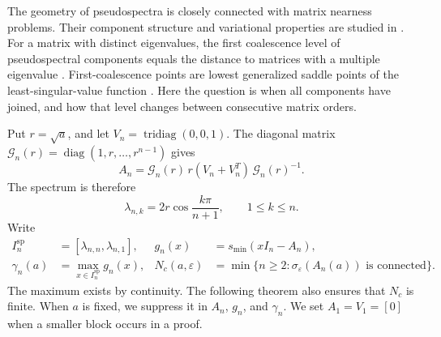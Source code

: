\documentclass[preprints,article,accept,oneauthor]{Definitions/mdpi}
\numberwithin{equation}{section}
\newcounter{result}[section]
\theoremstyle{mdpi}
\newtheorem{theorem}[result]{Theorem}
\theoremstyle{definition}
\DeclareMathOperator{\diag}{diag}
\DeclareMathOperator{\tridiag}{tridiag}
\begin{document}
The geometry of pseudospectra is closely connected with matrix nearness
problems.  Their component structure and variational properties are studied
in \cite{BurkeLewisOverton2003}.  For a matrix with distinct eigenvalues,
the first coalescence level of pseudospectral components equals the distance to matrices with a multiple eigenvalue
\cite{BurkeLewisOverton2007}.  First-coalescence points are lowest generalized saddle points of the
least-singular-value function \cite{AlamEtAl2011}.  Here the question is when all components have joined,
and how that level changes between consecutive matrix orders.

Put \(r=\sqrt a\), and let \(V_n=\tridiag(0,0,1)\).  The diagonal matrix
\(\mathcal G_n(r)=\diag(1,r,\ldots,r^{n-1})\) gives
\begin{equation}\label{eq:intro-similarity}
 A_n=\mathcal G_n(r)\,r(V_n+V_n^T)\,\mathcal G_n(r)^{-1}.
\end{equation}
The spectrum is therefore
\begin{equation}\label{eq:eigenvalues}
 \lambda_{n,k}=2r\cos\frac{k\pi}{n+1},\qquad 1\leq k\leq n.
\end{equation}
Write
\begin{equation}\label{eq:barrier-definition}
 \begin{aligned}
 I_n^{\mathrm{sp}}&=[\lambda_{n,n},\lambda_{n,1}],&
 g_n(x)&=s_{\min}(xI_n-A_n),\\
 \gamma_n(a)&=\max_{x\in I_n^{\mathrm{sp}}}g_n(x),&
 N_c(a,\varepsilon)&=\min\{n\geq2:
 \sigma_\varepsilon(A_n(a))\text{ is connected}\}.
 \end{aligned}
\end{equation}
The maximum exists by continuity.  The following theorem also ensures that
\(N_c\) is finite.  When \(a\) is fixed, we suppress it in \(A_n\),
\(g_n\), and \(\gamma_n\).  We set \(A_1=V_1=[0]\) when a smaller block
occurs in a proof.

\end{document}
